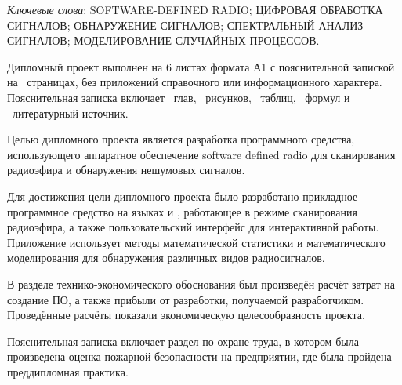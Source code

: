 \thispagestyle{empty}

\emph{Ключевые слова}: \MakeUppercase{software-defined radio; цифровая обработка сигналов; обнаружение сигналов; спектральный анализ сигналов; моделирование случайных процессов}.

\vspace{4\parsep}

Дипломный проект выполнен на 6 листах формата А1 с пояснительной запиской на~\pageref*{LastPage} страницах, без приложений справочного или информационного характера. 
Пояснительная записка включает ~глав, \totfig{}~рисунков, \tottab{}~таблиц, \toteq{}~формул и \totref{}~литературный источник.

Целью дипломного проекта является разработка программного средства, использующего аппаратное обеспечение software defined radio для сканирования радиоэфира и обнаружения нешумовых сигналов.

Для достижения цели дипломного проекта было разработано прикладное программное средство на языках \python{} и \purec{}, работающее в режиме сканирования радиоэфира, а также пользовательский интерфейс для интерактивной работы.
Приложение использует методы математической статистики и математического моделирования для обнаружения различных видов радиосигналов.

В разделе технико-экономического обоснования был произведён расчёт затрат на создание ПО, а также прибыли от разработки, получаемой разработчиком.
Проведённые расчёты показали экономическую целесообразность проекта.

Пояснительная записка включает раздел по охране труда, в котором была произведена оценка пожарной безопасности на предприятии, где была пройдена преддипломная практика.

\clearpage
